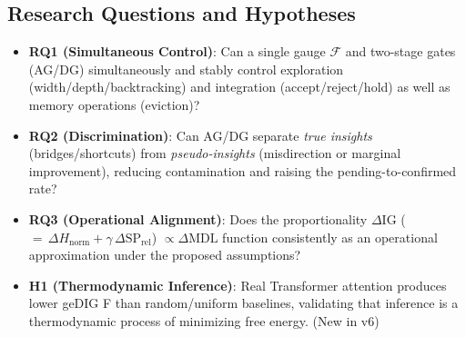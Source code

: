 \documentclass[12pt]{article}
\newcommand{\F}{\mathcal{F}}
\begin{document}
\subsection*{Research Questions and Hypotheses}
\begin{itemize}[leftmargin=1.4em]
  \item \textbf{RQ1 (Simultaneous Control)}: Can a single gauge $\F$ and two-stage gates (AG/DG) simultaneously and stably control exploration (width/depth/backtracking) and integration (accept/reject/hold) as well as memory operations (eviction)?
  \item \textbf{RQ2 (Discrimination)}: Can AG/DG separate \emph{true insights} (bridges/shortcuts) from \emph{pseudo-insights} (misdirection or marginal improvement), reducing contamination and raising the pending-to-confirmed rate?
  \item \textbf{RQ3 (Operational Alignment)}: Does the proportionality $\Delta\mathrm{IG}$ ($=\,\Delta H_{\mathrm{norm}}+\gamma\,\Delta\mathrm{SP}_{\mathrm{rel}}$) $\propto \Delta\mathrm{MDL}$ function consistently as an operational approximation under the proposed assumptions?
  \item \textbf{H1 (Thermodynamic Inference)}: Real Transformer attention produces lower geDIG F than random/uniform baselines, validating that inference is a thermodynamic process of minimizing free energy. (New in v6)
\end{itemize}
\end{document}
